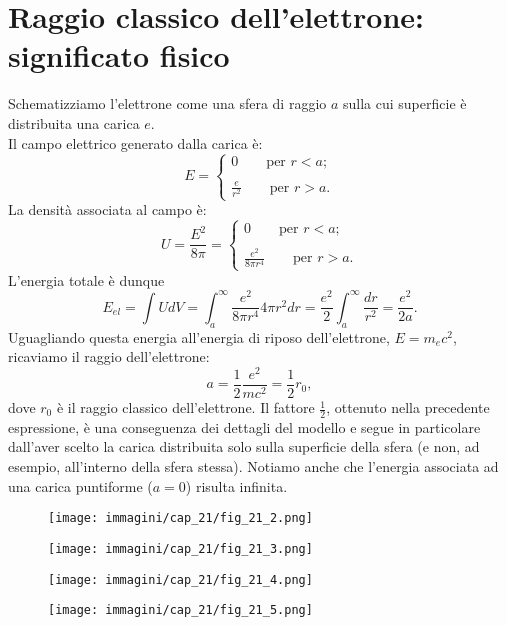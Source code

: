 \section[Raggio classico dell'elettrone]{Raggio classico dell'elettrone: significato fisico}
Schematizziamo l'elettrone come una sfera di raggio $a$ sulla cui superficie è distribuita una carica $e$.\\

Il campo elettrico generato dalla carica è:
\begin{equation}
E=\begin{cases}
0 \qquad \textrm{per }r<a;\\
\\
\displaystyle{\frac{e}{r^2}} \qquad \textrm{per }r>a.
\end{cases}
\end{equation}
La densità associata al campo è:
\begin{equation}
U=\frac{E^2}{8\pi}=\begin{cases}
0 \qquad \textrm{per }r<a;\\
\\
\displaystyle{\frac{e^2}{8\pi r^4}} \qquad \textrm{per }r>a.
\end{cases}
\end{equation}
L'energia totale è dunque
\begin{equation}
E_{el}=\int U dV = \int _a ^{\infty} \frac{e^2}{8\pi r^4} 4\pi r^2 dr = \frac{e^2}{2} \int _a ^{\infty} \frac{dr}{r^2}=\frac{e^2}{2a}. 
\end{equation}
Uguagliando questa energia all'energia di riposo dell'elettrone, $E=m_e c^2$, ricaviamo il raggio dell'elettrone:
\begin{equation}
a=\frac{1}{2}\frac{e^2}{mc^2}=\frac{1}{2} r_0,
\end{equation}
dove $r_0$ è il raggio classico dell'elettrone. Il fattore $\frac{1}{2}$, ottenuto nella precedente espressione, è una conseguenza dei dettagli del modello e segue in particolare dall'aver scelto la carica distribuita solo sulla superficie della sfera (e non, ad esempio, all'interno della sfera stessa). Notiamo anche che l'energia associata ad una carica puntiforme ($a=0$) risulta infinita.
\begin{figure}[!htbp]
\begin{center}
\texttt{[image: immagini/cap\_21/fig\_21\_2.png]}\\
\end{center}
\end{figure}
\begin{figure}[!htbp]
\begin{center}
\texttt{[image: immagini/cap\_21/fig\_21\_3.png]}\\
\end{center}
\end{figure}
\begin{figure}[!htbp]
\begin{center}
\texttt{[image: immagini/cap\_21/fig\_21\_4.png]}\\
\end{center}
\end{figure}
\begin{figure}[!htbp]
\begin{center}
\texttt{[image: immagini/cap\_21/fig\_21\_5.png]}
\end{center}
\end{figure}
